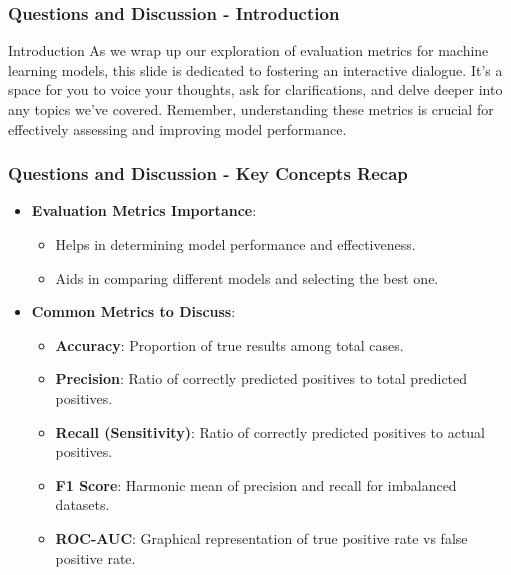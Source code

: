 \documentclass[aspectratio=169]{beamer}
\begin{document}
\begin{frame}[fragile]
    \frametitle{Questions and Discussion - Introduction}
    \begin{block}{Introduction}
        As we wrap up our exploration of evaluation metrics for machine learning models, this slide is dedicated to fostering an interactive dialogue. 
        It's a space for you to voice your thoughts, ask for clarifications, and delve deeper into any topics we've covered. 
        Remember, understanding these metrics is crucial for effectively assessing and improving model performance.
    \end{block}
\end{frame}

\begin{frame}[fragile]
    \frametitle{Questions and Discussion - Key Concepts Recap}
    \begin{itemize}
        \item \textbf{Evaluation Metrics Importance}:
            \begin{itemize}
                \item Helps in determining model performance and effectiveness.
                \item Aids in comparing different models and selecting the best one.
            \end{itemize}
        
        \item \textbf{Common Metrics to Discuss}:
            \begin{itemize}
                \item \textbf{Accuracy}: Proportion of true results among total cases.
                \item \textbf{Precision}: Ratio of correctly predicted positives to total predicted positives.
                \item \textbf{Recall (Sensitivity)}: Ratio of correctly predicted positives to actual positives.
                \item \textbf{F1 Score}: Harmonic mean of precision and recall for imbalanced datasets.
                \item \textbf{ROC-AUC}: Graphical representation of true positive rate vs false positive rate.
            \end{itemize}
    \end{itemize}
\end{frame}
\end{document}
